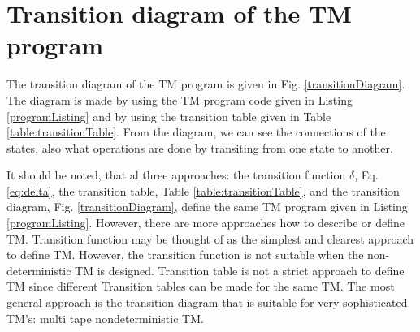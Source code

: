 \documentclass[12pt, a4paper]{report}
\begin{document}
{\section{Transition diagram of the TM program}
	The transition diagram of the TM program is given in Fig. \ref{transitionDiagram}. The diagram is made by using the TM program code given in Listing \ref{programListing} and by using the transition table given in Table \ref{table:transitionTable}. From the diagram, we can see the connections of the states, also what operations are done by transiting from one state to another.
	
	It should be noted, that al three approaches: the transition function $ \delta $, Eq. \eqref{eq:delta}, the transition table, Table \ref{table:transitionTable}, and the transition diagram, Fig. \ref{transitionDiagram}, define the same TM program given in Listing \ref{programListing}. However, there are more approaches how to describe or define TM. Transition function may be thought of as the simplest and clearest approach to define TM. However, the transition function is not suitable when the non-deterministic TM is designed. Transition table is not a strict approach to define TM since different Transition tables can be made for the same TM. The most general approach is the transition diagram that is suitable for very sophisticated TM's: multi tape nondeterministic TM.


\begin{figure}
	\centering


\end{figure}}
\end{document}
